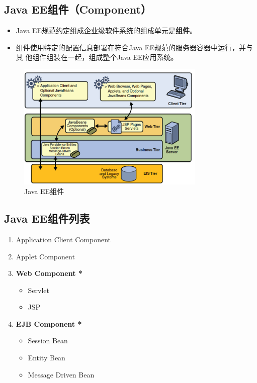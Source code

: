 \subsection{Java EE组件（Component）} 

\begin{itemize}
\item Java EE规范约定组成企业级软件系统的组成单元是{\bf\Red 组件}。
\item 组件使用特定的配置信息部署在符合Java EE规范的服务器容器中运行，并与其
  他组件组装在一起，组成整个Java EE应用系统。
\end{itemize}

\begin{figure}[htb]
\centering
\includegraphics[width=0.8\textwidth]{images/JavaEE-architecture/fig-javaee-components.png}
\caption{Java EE组件}
\label{fig:javaee-components}
\end{figure}

\subsection{Java EE组件列表}

\begin{enumerate}
\item Application Client Component 
\item Applet Component
\item {\bf\Blue Web Component *} 
  \begin{itemize}
  \item Servlet 
  \item JSP
  \end{itemize}
\item {\bf\Blue EJB Component *}
  \begin{itemize}
  \item Session Bean
  \item Entity Bean
  \item Message Driven Bean
  \end{itemize}
\end{enumerate}


